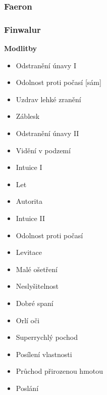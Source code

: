 \subsubsection{Faeron}
\label{sec:faeron}

\subsubsection{Finwalur}
\label{sec:finwalur}

\textbf{Modlitby}

\begin{itemize}

\item Odstranění únavy I
\item Odolnost proti počasí [sám]
\item Uzdrav lehké zranění
\item Záblesk
\item Odstranění únavy II
\item Vidění v podzemí
\item Intuice I
\item Let 
\item Autorita
\item Intuice II
\item Odolnost proti počasí
\item Levitace
\item Malé ošetření
\item Neslyšitelnost
\item Dobré spaní
\item Orlí oči
\item Superrychlý pochod
\item Posílení vlastnosti
\item Průchod přirozenou hmotou
\item Poslání

\end{itemize}

